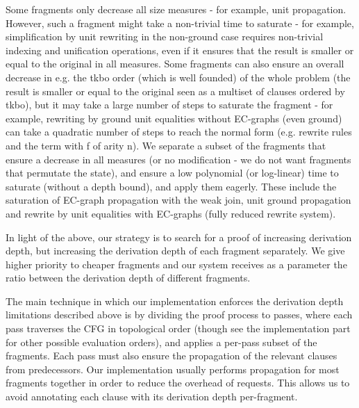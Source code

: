 Some fragments only decrease all size measures - for example, unit propagation. 
However, such a fragment might take a non-trivial time to saturate - for example, simplification by unit rewriting in the non-ground case requires non-trivial indexing and unification operations, even if it ensures that the result is smaller or equal to the original in all measures. Some fragments can also ensure an overall decrease in e.g. the tkbo order (which is well founded) of the whole problem (the result is smaller or equal to the original seen as a multiset of clauses ordered by tkbo), but it may take a large number of steps to saturate the fragment - for example, rewriting by ground unit equalities without EC-graphs (even ground) can take a quadratic number of steps to reach the normal form (e.g. rewrite rules  and the term  with f of arity n). 
We separate a subset of the fragments that ensure a decrease in all measures (or no modification - we do not want fragments that permutate the state), and ensure a low polynomial (or log-linear) time to saturate (without a depth bound), and apply them eagerly.
These include the saturation of EC-graph propagation with the weak join, unit ground propagation and rewrite by unit equalities with EC-graphs (fully reduced rewrite system).

In light of the above, our strategy is to search for a proof of increasing derivation depth, but increasing the derivation depth of each fragment separately. We give higher priority to cheaper fragments and our system receives as a parameter the ratio between the derivation depth of different fragments.

The main technique in which our implementation enforces the derivation depth limitations described above is by dividing the proof process to passes, where each pass traverses the CFG in topological order (though see the implementation part for other possible evaluation orders),
and applies a per-pass subset of the fragments. Each pass must also ensure the propagation of the relevant clauses from predecessors. Our implementation usually performs propagation for most fragments together in order to reduce the overhead of requests.
This allows us to avoid annotating each clause with its derivation depth per-fragment.


